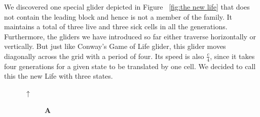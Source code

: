 \documentclass[12pt]{article}
\numberwithin{figure}{section} %
\begin{document}
We discovered one special glider depicted in Figure ~\ref{fig:the new life} that does not contain the leading block and hence is not a member of the family. It maintains a total of three live and three sick cells in all the generations. Furthermore, the gliders we have introduced so far either traverse horizontally or vertically. But just like Conway’s Game of Life glider, this glider moves diagonally across the grid with a period of four. Its speed is also $\frac{c}{4}$, since it takes four generations for a given state to be translated by one cell. We decided to call this the new Life with three states.
\begin{figure}[H]
\begin{center}
{\Huge$\uparrow$}
\end{center}
     	\begin{subfigure}[t]{0.03\textwidth}
    		\textbf{A}
  	\end{subfigure}	
 	\begin{subfigure}{0.18\textwidth}
     		\centering

\end{subfigure}
\end{figure}
\end{document}
